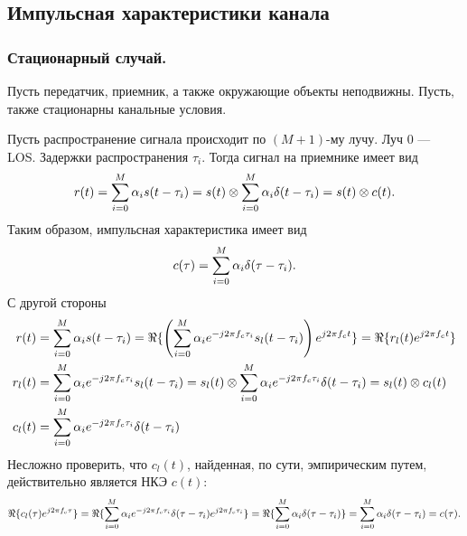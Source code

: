 \documentclass{book}
\numberwithin{theorem}{chapter}
\numberwithin{statement}{chapter}
\numberwithin{lemma}{chapter}
\theoremstyle{definition}
\numberwithin{task}{chapter}
\theoremstyle{remark}
\numberwithin{example}{chapter}
\theoremstyle{definition}
\numberwithin{definition}{chapter}
\theoremstyle{remark}
\theoremstyle{remark}
\numberwithin{lyrics}{section}
\begin{document}
%

\subsection{Импульсная характеристики канала}

\subsubsection{Стационарный случай.}
Пусть передатчик, приемник, а также окружающие объекты неподвижны. Пусть, также стационарны канальные условия.

Пусть распространение сигнала происходит по $(M + 1)$-му лучу. Луч $0$ --- LOS. Задержки распространения $\tau_i$. Тогда сигнал на приемнике имеет вид
\begin{equation}
r(t) = \sum\limits_{i = 0}^M \alpha_i s(t - \tau_i) = s(t) \otimes \sum\limits_{i = 0}^M \alpha_i \delta(t - \tau_i) = s(t) \otimes c(t).
\end{equation}
Таким образом, импульсная характеристика имеет вид
\begin{equation}
c(\tau) = \sum\limits_{i = 0}^M \alpha_i \delta(\tau - \tau_i).
\end{equation}
С другой стороны
\begin{align}
r(t) & = \Sum_{i = 0}^M \alpha_i s(t - \tau_i) %
= \Re\{  \left(\Sum_{i=0}^M \alpha_i e^{-j 2\pi f_c \tau_i} s_l(t - \tau_i) \right) e^{j 2\pi f_c t}\}  = \Re\{ r_l(t) e^{j 2\pi f_c t}\} \label{eq:channels:stat:eq0} \\
r_l(t) & =  \Sum_{i=0}^M \alpha_i e^{-j 2 \pi f_c \tau_i} s_l(t - \tau_i) = s_l(t) \otimes \Sum_{i=0}^M \alpha_i  e^{-j 2 \pi f_c \tau_i} \delta(t - \tau_i) = s_l(t) \otimes c_l(t) \label{eq:channels:stat:eq1} \\
c_l(t) & = \Sum_{i=0}^M \alpha_i  e^{-j 2 \pi f_c \tau_i} \delta(t - \tau_i) \label{eq:channels:stat:eq2} 
\end{align}
Несложно проверить, что $c_l(t)$, найденная, по сути, эмпирическим путем, действительно является НКЭ $c(t)$:
\begin{gather*}
\Re \{c_l(\tau) e^{j2\pi f_c \tau}\} = \Re\{\sum\limits_{i=0}^M \alpha_i e^{-j 2\pi f_c \tau_i}\delta(\tau - \tau_i) e^{j 2 \pi f_c \tau_i}\} = \Re\{\sum\limits_{i=0}^M \alpha_i \delta(\tau - \tau_i)\} = \sum\limits_{i=0}^M \alpha_i \delta(\tau - \tau_i) = c(\tau).
\end{gather*}
\end{document}
